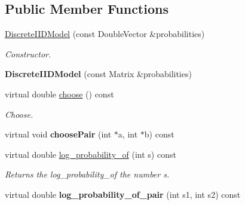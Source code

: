 \subsection*{Public Member Functions}
\begin{DoxyCompactItemize}
\item 
\hyperlink{classtops_1_1DiscreteIIDModel_a229cd565d9c721d9524f3aff2a5a4532}{Discrete\+I\+I\+D\+Model} (const Double\+Vector \&probabilities)
\begin{DoxyCompactList}\small\item\em Constructor. \end{DoxyCompactList}\item 
\mbox{\label{classtops_1_1DiscreteIIDModel_a76f0b01fc969d306ea3a4165023e2941}} 
{\bfseries Discrete\+I\+I\+D\+Model} (const Matrix \&probabilities)
\item 
\mbox{\label{classtops_1_1DiscreteIIDModel_a71d8b5b349b073b831fb8a02a6a963b9}} 
virtual double \hyperlink{classtops_1_1DiscreteIIDModel_a71d8b5b349b073b831fb8a02a6a963b9}{choose} () const
\begin{DoxyCompactList}\small\item\em Choose. \end{DoxyCompactList}\item 
\mbox{\label{classtops_1_1DiscreteIIDModel_a944742bf86b64299af198f54c3f5affb}} 
virtual void {\bfseries choose\+Pair} (int $\ast$a, int $\ast$b) const
\item 
\mbox{\label{classtops_1_1DiscreteIIDModel_a1d932c0abddc9a93430fee7a0e3bd990}} 
virtual double \hyperlink{classtops_1_1DiscreteIIDModel_a1d932c0abddc9a93430fee7a0e3bd990}{log\+\_\+probability\+\_\+of} (int s) const
\begin{DoxyCompactList}\small\item\em Returns the log\+\_\+probability\+\_\+of the number s. \end{DoxyCompactList}\item 
\mbox{\label{classtops_1_1DiscreteIIDModel_a4a4dbdd358d8823892da0a8039c5489a}} 
virtual double {\bfseries log\+\_\+probability\+\_\+of\+\_\+pair} (int s1, int s2) const
\item 

\end{DoxyCompactItemize}
